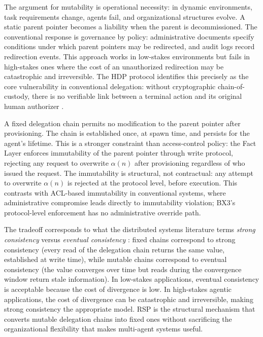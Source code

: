 The argument for mutability is operational necessity: in dynamic environments, task requirements change, agents fail, and organizational structures evolve. A static parent pointer becomes a liability when the parent is decommissioned. The conventional response is governance by policy: administrative documents specify conditions under which parent pointers may be redirected, and audit logs record redirection events. This approach works in low-stakes environments but fails in high-stakes ones where the cost of an unauthorized redirection may be catastrophic and irreversible. The HDP protocol identifies this precisely as the core vulnerability in conventional delegation: without cryptographic chain-of-custody, there is no verifiable link between a terminal action and its original human authorizer \cite{hdp-draft,hdp-draft-2}.

A fixed delegation chain permits no modification to the parent pointer after provisioning. The chain is established once, at spawn time, and persists for the agent's lifetime. This is a stronger constraint than access-control policy: the Fact Layer enforces immutability of the parent pointer through write protocol, rejecting any request to overwrite $\alpha(n)$ after provisioning regardless of who issued the request. The immutability is structural, not contractual: any attempt to overwrite $\alpha(n)$ is rejected at the protocol level, before execution. This contrasts with ACL-based immutability in conventional systems, where administrative compromise leads directly to immutability violation; BX3's protocol-level enforcement has no administrative override path.

The tradeoff corresponds to what the distributed systems literature terms \emph{strong consistency} versus \emph{eventual consistency} \cite{vogels2009eventual}: fixed chains correspond to strong consistency (every read of the delegation chain returns the same value, established at write time), while mutable chains correspond to eventual consistency (the value converges over time but reads during the convergence window return stale information). In low-stakes applications, eventual consistency is acceptable because the cost of divergence is low. In high-stakes agentic applications, the cost of divergence can be catastrophic and irreversible, making strong consistency the appropriate model. RSP is the structural mechanism that converts mutable delegation chains into fixed ones without sacrificing the organizational flexibility that makes multi-agent systems useful.

